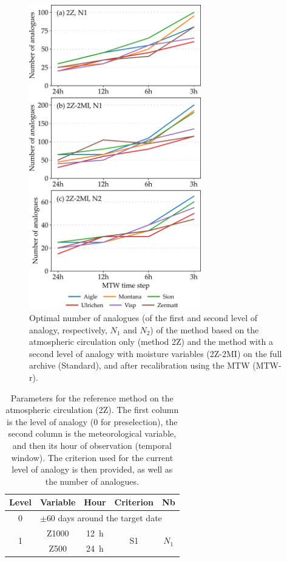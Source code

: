 \documentclass[hess, manuscript]{copernicus}
\begin{document}
	\begin{figure}[htb]
	\includegraphics[width=7.5cm]{fig12.pdf}
	\caption{Optimal number of analogues (of the first and second level of analogy, respectively, $N_{1}$ and $N_{2}$) of the method based on the atmospheric circulation only (method 2Z) and the method with a second level of analogy with moisture variables (2Z-2MI) on the full archive (Standard), and after recalibration using the MTW (MTW-r).}
	\label{fig:analog_nb}
	\end{figure}
	
	
	\clearpage
	
	
	\begin{table}[htb]
		\caption{Parameters for the reference method on the atmospheric circulation (2Z). The first column is the level of analogy (0 for preselection), the second column is the meteorological variable, and then its hour of observation (temporal window). The criterion used for the current level of analogy is then provided, as well as the number of analogues.}
		\footnotesize
		\begin{center}
			\begin{tabular}{ccccc}
				\hline
				Level & Variable & Hour & Criterion & Nb \\ 
				\hline 
				0 & \multicolumn{4}{l}{$\pm 60$ days around the target date} \\
				\hline 
				\multirow{2}{*}{1} & Z1000 & 12~h & \multirow{2}{*}{S1} & \multirow{2}{*}{$N_{1}$} \\
				& Z500 & 24~h & & \\ 
				\hline 
			\end{tabular} 
		\end{center}
		\label{table:method_2Z}
	\end{table}
	
\end{document}
